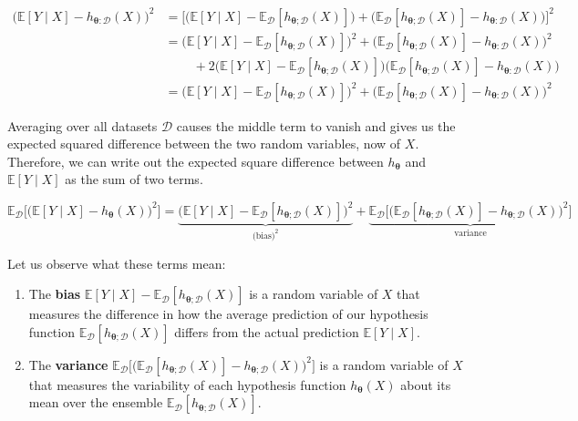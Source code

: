 \documentclass{article}
\theoremstyle{definition}
\begin{document}
      \begin{align*}
        \big(\mathbb{E}[Y \mid X] - h_{{\boldsymbol{\theta}}:\mathcal{D}} (X) \big)^2 & =  \big[ \big( \mathbb{E}[Y \mid X] - \mathbb{E}_\mathcal{D} [h_{{\boldsymbol{\theta}}; \mathcal{D}} (X)] \big) + \big( \mathbb{E}_\mathcal{D} [h_{{\boldsymbol{\theta}}; \mathcal{D}} (X)] - h_{{\boldsymbol{\theta}}:\mathcal{D}} (X) \big) \big]^2 \\
        & = \big( \mathbb{E}[Y \mid X] - \mathbb{E}_\mathcal{D} [h_{{\boldsymbol{\theta}}; \mathcal{D}} (X)] \big)^2 + \big( \mathbb{E}_\mathcal{D} [h_{{\boldsymbol{\theta}}; \mathcal{D}} (X)] - h_{{\boldsymbol{\theta}}:\mathcal{D}} (X) \big)^2 \\
        & \;\;\;\;\;\;\;\; + 2 \big( \mathbb{E}[Y \mid X] - \mathbb{E}_\mathcal{D} [h_{{\boldsymbol{\theta}}; \mathcal{D}} (X)] \big) \big( \mathbb{E}_\mathcal{D} [h_{{\boldsymbol{\theta}}; \mathcal{D}} (X)] - h_{{\boldsymbol{\theta}}:\mathcal{D}} (X) \big) \\
        & = \big( \mathbb{E}[Y \mid X] - \mathbb{E}_\mathcal{D} [h_{{\boldsymbol{\theta}}; \mathcal{D}} (X)] \big)^2 + \big( \mathbb{E}_\mathcal{D} [h_{{\boldsymbol{\theta}}; \mathcal{D}} (X)] - h_{{\boldsymbol{\theta}}:\mathcal{D}} (X) \big)^2 
      \end{align*}

      Averaging over all datasets $\mathcal{D}$ causes the middle term to vanish and gives us the expected squared difference between the two random variables, now of $X$. Therefore, we can write out the expected square difference between $h_{\boldsymbol{\theta}}$ and $\mathbb{E}[Y\mid X]$ as the sum of two terms. 

        \[\mathbb{E}_\mathcal{D} \big[ \big(\mathbb{E}[Y \mid X] - h_{\boldsymbol{\theta}}(X) \big)^2 \big] = \underbrace{\big( \mathbb{E}[Y \mid X] - \mathbb{E}_\mathcal{D} [h_{{\boldsymbol{\theta}}; \mathcal{D}} (X)] \big)^2}_{\text{(bias)}^2} + \underbrace{ \mathbb{E}_\mathcal{D} \big[ \big( \mathbb{E}_\mathcal{D} [h_{{\boldsymbol{\theta}}; \mathcal{D}} (X)] - h_{\boldsymbol{\theta}; \mathcal{D}}(X) \big)^2 \big]}_{\text{variance}}\]

      Let us observe what these terms mean: 

      \begin{enumerate}
        \item The \textbf{bias} $\mathbb{E}[Y \mid X] - \mathbb{E}_\mathcal{D} [h_{{\boldsymbol{\theta}}; \mathcal{D}} (X)]$ is a random variable of $X$ that measures the difference in how the average prediction of our hypothesis function $\mathbb{E}_\mathcal{D} [h_{{\boldsymbol{\theta}}; \mathcal{D}} (X)]$ differs from the actual prediction $\mathbb{E}[Y \mid X]$. 

        \item The \textbf{variance} $\mathbb{E}_\mathcal{D} \big[ \big( \mathbb{E}_\mathcal{D} [h_{{\boldsymbol{\theta}}; \mathcal{D}} (X)] - h_{{\boldsymbol{\theta}}; \mathcal{D}} (X) \big)^2 \big]$ is a random variable of $X$ that measures the variability of each hypothesis function $h_{\boldsymbol{\theta}}(X)$ about its mean over the ensemble $\mathbb{E}_\mathcal{D} [h_{{\boldsymbol{\theta}}; \mathcal{D}} (X)]$. 
      \end{enumerate}
\end{document}
